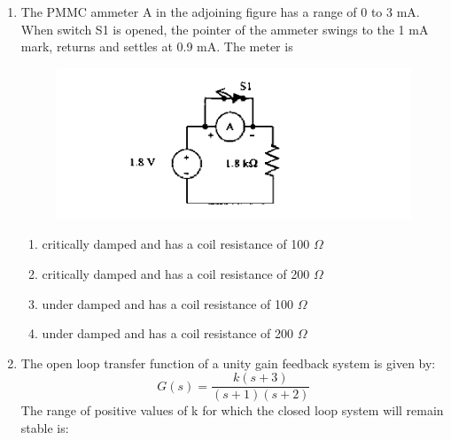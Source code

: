 \documentclass[journal,12pt,onecolumn]{IEEEtran}
\theoremstyle{remark}
\begin{document}
\begin{enumerate}
\hfill{}
\begin{enumerate}
\end{enumerate}

\item  The PMMC ammeter A in the adjoining figure has a range of 0 to 3 mA. When switch S1 is opened, the pointer of the ammeter swings to the 1 mA mark, returns and settles at 0.9 mA. The meter is
\begin{figure}[H]
    \centering
    \includegraphics[scale=0.75]{q11}
    \caption*{}
    \label{fig:placeholder}
\end{figure}

\hfill{}
\begin{enumerate}
\item  critically damped and has a coil resistance of 100 $\Omega$
\item critically damped and has a coil resistance of 200 $\Omega$
\item under damped and has a coil resistance of 100 $\Omega$
\item under damped and has a coil resistance of 200 $\Omega$
\end{enumerate}

\item The open loop transfer function of a unity gain feedback system is given by: \[G(s) = \frac{k(s+3)}{(s+1)(s+2)}\]The range of positive values of k for which the closed loop system will remain stable is:

\hfill{}
\begin{enumerate}
\end{enumerate}


\end{enumerate}
\end{document}
